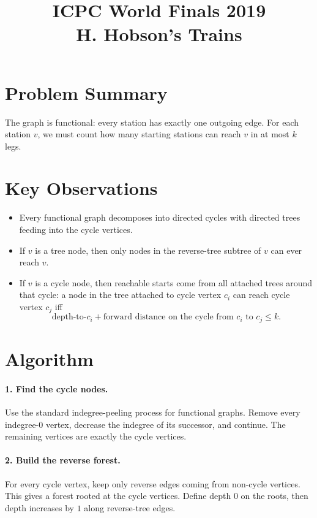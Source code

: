 \documentclass[11pt]{article}
\title{ICPC World Finals 2019\\H. Hobson's Trains}
\author{}
\date{}
\begin{document}
\maketitle

\section*{Problem Summary}

The graph is functional: every station has exactly one outgoing edge. For each station $v$, we must count how many starting stations can reach $v$ in at most $k$ legs.

\section*{Key Observations}

\begin{itemize}[leftmargin=*]
    \item Every functional graph decomposes into directed cycles with directed trees feeding into the cycle vertices.
    \item If $v$ is a tree node, then only nodes in the reverse-tree subtree of $v$ can ever reach $v$.
    \item If $v$ is a cycle node, then reachable starts come from all attached trees around that cycle: a node in the tree attached to cycle vertex $c_i$ can reach cycle vertex $c_j$ iff
    \[
    \text{depth-to-}c_i + \text{forward distance on the cycle from } c_i \text{ to } c_j \le k.
    \]
\end{itemize}

\section*{Algorithm}

\paragraph{1. Find the cycle nodes.}
Use the standard indegree-peeling process for functional graphs. Remove every indegree-$0$ vertex, decrease the indegree of its successor, and continue. The remaining vertices are exactly the cycle vertices.

\paragraph{2. Build the reverse forest.}
For every cycle vertex, keep only reverse edges coming from non-cycle vertices. This gives a forest rooted at the cycle vertices. Define depth $0$ on the roots, then depth increases by $1$ along reverse-tree edges.
\end{document}
